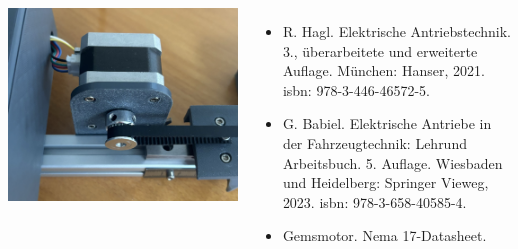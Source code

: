 \documentclass[25pt,a0paper, portrait]{tikzposter}
\begin{document}
\begin{columns} 
	
	{
		{
			\begin{tikzfigure}
				\includegraphics[width=\linewidth]{images/Schrittmotor}
			\end{tikzfigure}	
		}
		{
			\begin{itemize}
				\item R. Hagl. Elektrische Antriebstechnik. 3., überarbeitete und erweiterte Auflage. München: Hanser, 2021. isbn: 978-3-446-46572-5.
				\item G. Babiel. Elektrische Antriebe in der Fahrzeugtechnik: Lehrund Arbeitsbuch. 5. Auflage. Wiesbaden und Heidelberg: Springer Vieweg, 2023. isbn: 978-3-658-40585-4.
				\item Gemsmotor. Nema 17-Datasheet.
			\end{itemize}
		}
	}
	

\end{columns}
\end{document}
